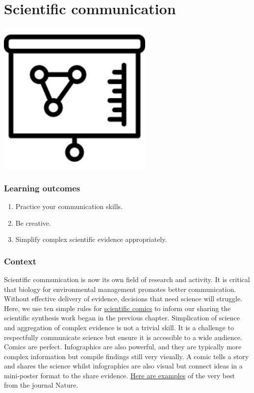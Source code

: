 \documentclass[
]{book}
\providecommand{\tightlist}{%
  \setlength{\itemsep}{0pt}\setlength{\parskip}{0pt}}
\begin{document}
\hypertarget{scicomm}{%
\chapter{Scientific communication}\label{scicomm}}

\includegraphics[width=3in,height=\textheight]{./scicomm.png}

\hypertarget{learning-outcomes-7}{%
\subsection*{Learning outcomes}\label{learning-outcomes-7}}

\begin{enumerate}
\def\labelenumi{\arabic{enumi}.}
\tightlist
\item
  Practice your communication skills.
\item
  Be creative.\\
\item
  Simplify complex scientific evidence appropriately.
\end{enumerate}

\hypertarget{context-6}{%
\subsection*{Context}\label{context-6}}

Scientific communication is now its own field of research and activity. It is critical that biology for environmental management promotes better communication. Without effective delivery of evidence, decisions that need science will struggle. Here, we use ten simple rules for \href{https://journals.plos.org/ploscompbiol/article?id=10.1371/journal.pcbi.1005845}{scientific comics} \citep{RN7247} to inform our sharing the scientific synthesis work began in the previous chapter. Simplication of science and aggregation of complex evidence is not a trivial skill. It is a challenge to respectfully communicate science but ensure it is accessible to a wide audience. Comics are perfect. Infographics are also powerful, and they are typically more complex information but compile findings still very visually. A comic tells a story and shares the science whilst infographics are also visual but connect ideas in a mini-poster format to the share evidence. \href{https://www.nature.com/articles/d41586-017-08542-5}{Here are examples} of the very best from the journal Nature.
\end{document}
